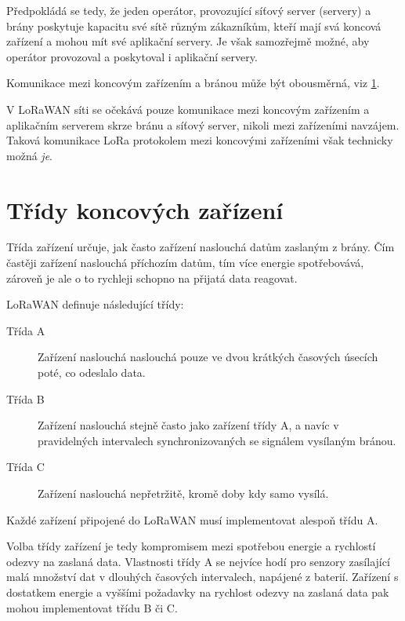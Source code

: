     Předpokládá se tedy, že jeden operátor, provozující síťový server (servery)
    a brány poskytuje kapacitu své sítě různým zákazníkům, kteří mají svá koncová
    zařízení a mohou mít své aplikační servery. 
    Je však samozřejmě možné, aby operátor provozoval
    a poskytoval i aplikační servery.

    Komunikace mezi koncovým zařízením a bránou může být obousměrná,
    viz \ref{subsubsec:LoRaWAN_Classes}.

    V LoRaWAN síti se očekává pouze komunikace mezi koncovým zařízením a aplikačním
    serverem skrze bránu a síťový server,
    nikoli mezi zařízeními navzájem. Taková komunikace LoRa protokolem mezi
    koncovými zařízeními však technicky možná \emph{je}.


\section{Třídy koncových zařízení}
    \label{subsubsec:LoRaWAN_Classes}

    Třída zařízení určuje, jak často zařízení naslouchá datům zaslaným z brány.
    Čím častěji zařízení naslouchá příchozím datům, tím více energie 
    spotřebovává, zároveň je ale o to rychleji schopno na přijatá data reagovat.

    LoRaWAN definuje následující třídy:    
    \begin{description}
        \item [Třída A] Zařízení naslouchá naslouchá pouze ve dvou krátkých 
            časových úsecích poté, co odeslalo data.
        \item [Třída B] Zařízení naslouchá stejně často jako zařízení třídy A,
            a navíc v pravidelných intervalech synchronizovaných se
            signálem vysílaným bránou.
        \item [Třída C] Zařízení naslouchá nepřetržitě, kromě doby kdy samo vysílá.
    \end{description}

    Každé zařízení připojené do LoRaWAN musí implementovat alespoň třídu A.

    Volba třídy zařízení je tedy kompromisem mezi spotřebou energie a rychlostí
    odezvy na zaslaná data. 
    Vlastnosti třídy A se nejvíce hodí pro senzory zasílající malá množství dat
    v dlouhých časových intervalech, napájené z baterií.
    Zařízení s dostatkem energie a vyššími požadavky na rychlost
    odezvy na zaslaná data pak mohou implementovat třídu B či C.

